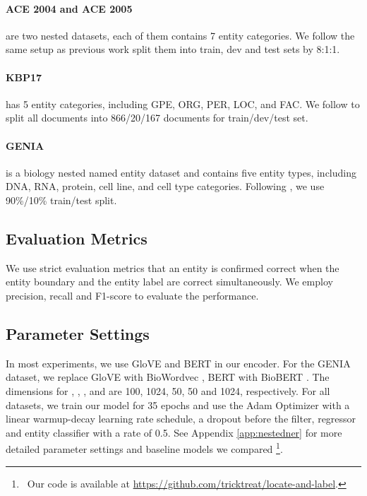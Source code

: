 \documentclass[11pt,a4paper]{article}
\begin{document}
\paragraph{ACE 2004 and ACE 2005} \citep{doddington-etal-2004-automatic, 2005-automatic} are two nested datasets, each of them contains 7 entity categories. We follow the same setup as previous work \citet{katiyar-cardie-2018-nested, lin-etal-2019-sequence} split them into train, dev and test sets by 8:1:1.

\paragraph{KBP17} \citep{DBLP:conf/tac/JiPZNMMC17} has 5 entity categories, including GPE, ORG, PER, LOC, and FAC. We follow \citet{lin-etal-2019-sequence} to split all documents into 866/20/167 documents for train/dev/test set.

\paragraph{GENIA} \citep{10.5555/1289189.1289260} is a biology nested named entity dataset and contains five entity types, including DNA, RNA, protein, cell line, and cell type categories. Following \citet{yu-etal-2020-named}, we use 90\%/10\% train/test split.

\subsection{Evaluation Metrics}

We use strict evaluation metrics that an entity is confirmed correct when the entity boundary and the entity label are correct simultaneously. We employ precision, recall and F1-score to evaluate the performance.

\subsection{Parameter Settings}
In most experiments, we use GloVE \citep{pennington-etal-2014-glove} and BERT \citep{devlin-etal-2019-bert} in our encoder. For the GENIA dataset, we replace GloVE with BioWordvec \citep{chiu-etal-2016-train}, BERT with BioBERT \citep{10.1093/bioinformatics/btz682}. The dimensions for , , ,  and  are 100, 1024, 50, 50 and 1024, respectively. For all datasets, we train our model for 35 epochs and use the Adam Optimizer with a linear warmup-decay learning rate schedule, a dropout before the filter, regressor and entity classifier with a rate of 0.5. See Appendix \ref{app:nestedner} for more detailed parameter settings and baseline models we compared \footnote{\ Our code is available at \url{https://github.com/tricktreat/locate-and-label}.}.
\end{document}

